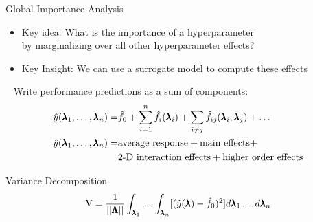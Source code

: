 \begin{frame}[c,fragile]{Global Importance Analysis}

\begin{itemize}
	\item \alert{Key idea}: What is the importance of a hyperparameter\\
	 by marginalizing over all other hyperparameter effects?
	 \pause
	\item \alert{Key Insight}: We can use a surrogate model to compute these effects
\end{itemize}


\pause
\begin{block}{\fanova{}~}
	Write performance predictions as a sum of components:
	\begin{eqnarray}
	\hat{y}(\pmb{\lambda}_1,\ldots,\pmb{\lambda}_n) =& \hat{f}_0 + \sum_{i=1}^{n} \hat{f}_i(\pmb{\lambda}_i) + \sum_{i \neq j} \hat{f}_{ij}(\pmb{\lambda}_i,\pmb{\lambda}_j) + \ldots \nonumber \\
	\hat{y}(\pmb{\lambda}_1,\ldots,\pmb{\lambda}_n) =& \text{average response} + \text{main effects} +\nonumber\\ &\text{2-D interaction effects} + \text{higher order effects} \nonumber
	\end{eqnarray}
\end{block}

\pause

\begin{block}{Variance Decomposition}
	\begin{equation}
	\mathrm{V} = \frac{1}{||\pmb{\Lambda}||} \int_{\pmb{\lambda}_1} \ldots \int_{\pmb{\lambda}_n} [(\hat{y}(\pmb{\lambda})- \hat{f}_0)^2] d\pmb{\lambda}_1 \ldots d\pmb{\lambda}_n\nonumber
	\end{equation}
\end{block}

\end{frame}
